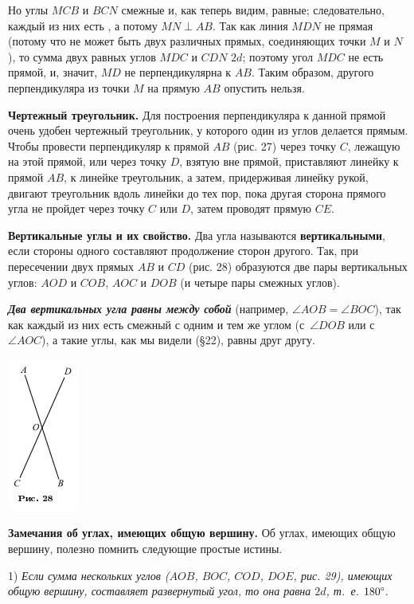 \documentclass[oneside]{book}
\begin{document}
Но углы $MCB$ и $BCN$ смежные и, как теперь видим, равные;
следовательно, каждый из них есть , а потому $MN\perp AB$.
Так как линия $MDN$ не прямая (потому что не может быть двух различных прямых, соединяющих точки $M$ и $N$), то сумма двух равных углов $MDC$ и $CDN$  $2d$;
поэтому угол $MDC$ не есть прямой, и, значит, $MD$ не перпендикулярна к $AB$.
Таким образом, другого перпендикуляра из точки $M$ на прямую $AB$ опустить нельзя.

\textbf{Чертежный треугольник.}
Для построения перпендикуляра к данной прямой очень удобен чертежный треугольник, у которого один из углов делается прямым.
Чтобы провести перпендикуляр к прямой $AB$ (рис. 27) через точку $C$, лежащую на этой прямой, или через точку $D$, взятую вне прямой, приставляют линейку к прямой $AB$, к линейке треугольник, а затем, придерживая линейку рукой, двигают треугольник вдоль линейки до тех пор, пока другая сторона прямого угла не пройдет через точку $C$ или $D$, затем проводят прямую $CE$.


\textbf{Вертикальные углы и их свойство.}
Два угла называются \textbf{вертикальными}, если стороны одного составляют продолжение сторон другого.
Так, при пересечении двух прямых $AB$ и $CD$ (рис. 28) образуются две пары вертикальных углов:
$AOD$ и $COB$, $AOC$ и $DOB$ (и четыре пары смежных углов).

\textbf{\emph{Два вертикальных угла равны между собой}} (например, $\angle AOB = \angle BOC$), так как каждый из них есть смежный с одним и тем же углом (с~$\angle DOB$ или с~$\angle AOC$), а такие углы, как мы видели (§22), равны друг другу.

\includegraphics{pics/ris-28}

\textbf{Замечания об углах, имеющих общую вершину.}
Об углах, имеющих общую вершину, полезно помнить следующие простые истины.

1) \emph{Если сумма нескольких углов ($AOB$, $BOC$, $COD$, $DOE$, рис. 29), имеющих общую вершину, составляет развернутый угол, то она равна $2d$, т.~е. $180\degree$.}
\end{document}
